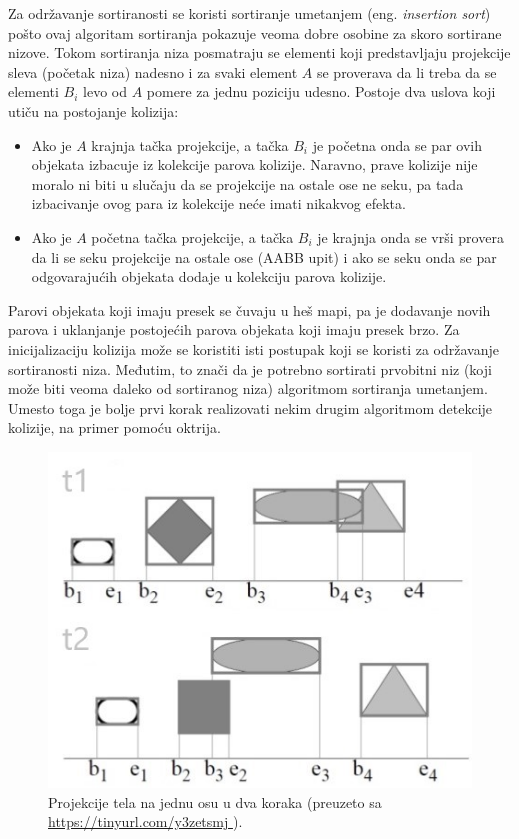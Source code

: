 \documentclass[12pt,oneside]{memoir}
\begin{document}
Za održavanje sortiranosti se koristi sortiranje umetanjem (eng. {\em insertion sort}) 
pošto ovaj algoritam sortiranja pokazuje veoma dobre osobine za skoro sortirane nizove.
Tokom sortiranja niza posmatraju se elementi koji predstavljaju projekcije sleva (početak niza) nadesno i za svaki element $A$ se proverava da li treba da se elementi $B_i$ levo od $A$
pomere za jednu poziciju udesno. Postoje dva uslova koji utiču na postojanje kolizija:
\begin{itemize}  
	\item Ako je $A$ krajnja tačka projekcije, a tačka $B_i$ je početna onda se par ovih objekata izbacuje iz kolekcije parova kolizije.
	Naravno, prave kolizije nije moralo ni biti u slučaju da se projekcije na ostale ose ne seku, 
	pa tada izbacivanje ovog para iz kolekcije neće imati nikakvog efekta.
	\item Ako je $A$ početna tačka projekcije, a tačka $B_i$ je krajnja onda se vrši provera da li se seku projekcije na ostale ose (AABB upit) i ako se seku
	onda se par odgovarajućih objekata dodaje u kolekciju parova kolizije.

\end{itemize}  

Parovi objekata koji imaju presek se čuvaju u heš mapi, pa je dodavanje novih parova i uklanjanje postojećih parova objekata koji imaju presek brzo.
Za inicijalizaciju kolizija može se koristiti isti postupak koji se koristi za održavanje sortiranosti niza.
Međutim, to znači da je potrebno sortirati prvobitni niz (koji može biti veoma daleko od sortiranog niza) algoritmom sortiranja umetanjem.
Umesto toga je bolje prvi korak realizovati nekim drugim algoritmom detekcije kolizije, na primer pomoću oktrija.

\begin{figure}[h!]
	\centering
	\includegraphics[scale=0.8]{sap.jpg}
	\caption{Projekcije tela na jednu osu u dva koraka (\tiny preuzeto sa \url{ https://tinyurl.com/y3zetsmj }).}
	
	\label{fig:sap}
\end{figure}
\end{document}
